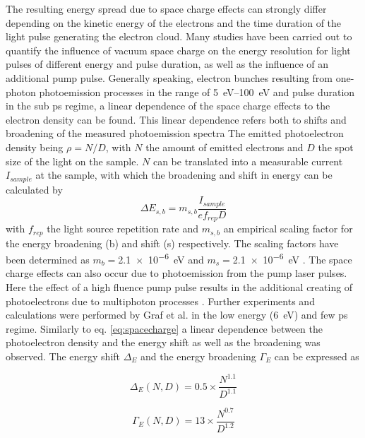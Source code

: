 The resulting energy spread due to space charge effects can strongly differ depending on the kinetic energy of the electrons and the time duration of the light pulse generating the electron cloud.
Many studies have been carried out to quantify the influence of vacuum space charge on the energy resolution for light pulses of different energy and pulse duration, as well as the influence of an additional pump pulse\cite{corder_ultrafast_2018,plotzing_spin-resolved_2016,hellmann_vacuum_2009,graf_vacuum_2010,frietsch_high-order_2013}.
Generally speaking, electron bunches resulting from one-photon photoemission processes in the range of \qtyrange{5}{100}{\electronvolt} and pulse duration in the sub \unit{\pico\second} regime, a linear dependence of the space charge effects to the electron density can be found.
This linear dependence refers both to shifts and broadening of the measured photoemission spectra \cite{corder_ultrafast_2018,plotzing_spin-resolved_2016}
The emitted photoelectron density being $\rho=N/D$, with $N$ the amount of emitted electrons and $D$ the spot size of the light on the sample.
$N$ can be translated into a measurable current $I_{sample}$ at the sample, with which the broadening and shift in energy can be calculated by
\begin{equation}
	\Delta E_{s,b} = m_{s,b} \frac{I_{sample}}{e f_{rep} D}
	\label{eq:spacecharge}
\end{equation}
with $f_{rep}$ the light source repetition rate and $m_{s,b}$ an empirical scaling factor for the energy broadening (b) and shift (s) respectively.
The scaling factors have been determined as $m_b=$\qty{2.1e-6}{\electronvolt} and $m_s=$\qty{2.1e-6}{\electronvolt} \cite{plotzing_spin-resolved_2016}.
The space charge effects can also occur due to photoemission from the pump laser pulses.
Here the effect of a high fluence pump pulse results in the additional creating of photoelectrons due to multiphoton processes \cite{al-obaidi_ultrafast_2015}.
Further experiments and calculations were performed by Graf et al. \cite{graf_vacuum_2010} in the low energy (\qty{6}{\electronvolt}) and few \unit{\pico\second} regime.
Similarly to eq. \ref{eq:spacecharge} a linear dependence between the photoelectron density and the energy shift as well as the broadening was observed.
The energy shift $\Delta_E$ and the energy broadening $\Gamma_E$ can be expressed as

\noindent\begin{minipage}{.5\linewidth}
	\begin{equation}
		\Delta_E(N,D)=0.5\times \frac{N^{1.1}}{D^{1.1}}
	\end{equation}
\end{minipage}%
\begin{minipage}{.5\linewidth}
	\begin{equation}
		\Gamma_E(N,D)=13\times \frac{N^{0.7}}{D^{1.2}}
	\end{equation}
\end{minipage}

